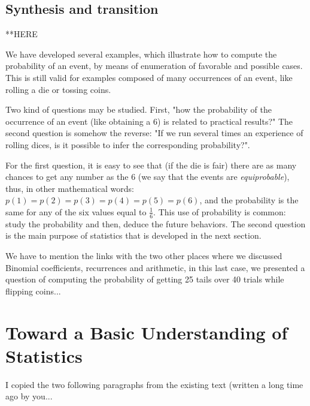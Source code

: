 
\subsection{Synthesis and transition}

**HERE

We have developed several examples, which illustrate how to compute the probability of an event,
by means of enumeration of favorable and possible cases. 
This is still valid for examples composed of many occurrences of an event,
like rolling a die or tossing coins. 

Two kind of questions may be studied.
First, "how the probability of the occurrence of an event (like obtaining a $6$) is related to practical results?"
The second question is somehow the reverse: "If we run several times an experience of rolling dices, is it possible 
to infer the corresponding probability?".

For the first question, it is easy to see that (if the die is fair) there are as many chances to get any number as the $6$
(we say that the events are \textit{equiprobable}),
thus, in other mathematical words: $p(1)=p(2)=p(3)=p(4)=p(5)=p(6)$,
and the probability is the same for any of the six values equal to $\frac{1}{6}$.
This use of probability is common: study the probability and then, deduce the future behaviors.
The second question is the main purpose of statistics that is developed in the next section.


{\Denis We have to mention the links with the two other places where we discussed Binomial coefficients, recurrences and arithmetic, in this last case, we presented a question of computing the probability of getting 25 tails over 40 trials while flipping coins...}



\section{Toward a Basic Understanding of Statistics}
\label{sec:statistics}


{\Denis I copied the two following paragraphs from the existing text (written a long time ago by you...}

